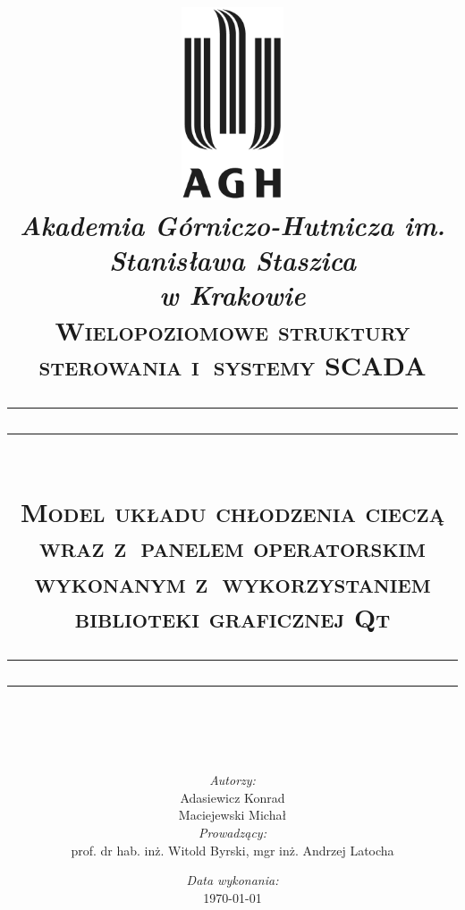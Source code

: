 \documentclass[12pt, a4paper]{article}
\begin{document}
    
    \pagestyle{fancy}
    \renewcommand{\headrulewidth}{0pt}
    \renewcommand{\footrulewidth}{0.4pt}
    \fancyhead{}
    \cfoot{}
    
    \begin{titlepage}
        \title{
        \centering
        \includegraphics[width=3cm]{../img/agh_logo.jpg}\\[1cm]
        \textit{\Large{Akademia Górniczo-Hutnicza im. Stanisława Staszica\\ w
        Krakowie}}\\[0.7cm]
        \large{\textsc{Wielopoziomowe struktury sterowania i~systemy
        SCADA}}\\[1cm]
        \rule{\textwidth}{1.6pt}\vspace*{-\baselineskip}\vspace*{2pt}
        \rule{\textwidth}{0.4pt}\\[\baselineskip]
        \Huge{\textsc{Model układu chłodzenia cieczą wraz z~panelem
        operatorskim wykonanym z~wykorzystaniem biblioteki graficznej Qt}}
        \rule{\textwidth}{0.4pt}\vspace*{-\baselineskip}\vspace{3.2pt}
        \rule{\textwidth}{1.6pt}\\[\baselineskip]}
        \author{\textit{Autorzy:}\\
        \Large{Adasiewicz Konrad}\\
        \Large{Maciejewski Michał}\\
        \textit{Prowadzący:}\\
        \Large{prof. dr hab. inż. Witold Byrski}, \Large{mgr inż. Andrzej
        Latocha}}
        \date{\textit{Data wykonania:}\\ \today}
        \maketitle
        \thispagestyle{empty}
    \end{titlepage}

    \tableofcontents

    
    
    
    
    
    
    
    
\end{document}
